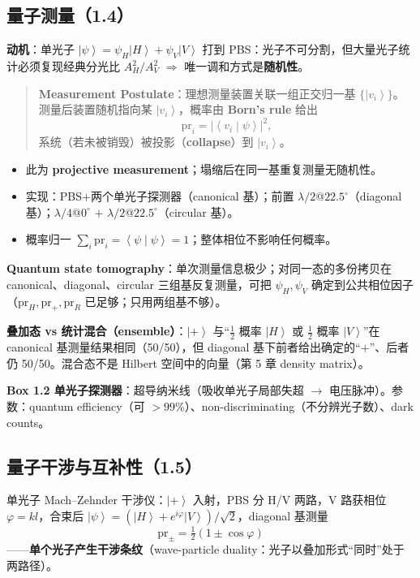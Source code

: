 \documentclass[11pt]{ctexart}
\newcommand{\ket}[1]{\left|#1\right\rangle}
\newcommand{\braket}[2]{\left\langle#1\middle|#2\right\rangle}
\begin{document}
\subsection{量子测量（1.4）}

\textbf{动机}：单光子 $\ket\psi=\psi_H\ket H+\psi_V\ket V$ 打到 PBS：光子不可分割，但大量光子统计必须复现经典分光比 $A_H^2/A_V^2$ $\Rightarrow$ 唯一调和方式是\textbf{随机性}。

\begin{quote}
\textbf{Measurement Postulate}：理想测量装置关联一组正交归一基 $\{\ket{v_i}\}$。测量后装置随机指向某 $\ket{v_i}$，概率由 \textbf{Born's rule} 给出
\[
\mathrm{pr}_i=\big|\braket{v_i}{\psi}\big|^2,
\]
系统（若未被销毁）被投影（\textbf{collapse}）到 $\ket{v_i}$。
\end{quote}

\begin{itemize}
\item 此为 \textbf{projective measurement}；塌缩后在同一基重复测量无随机性。
\item 实现：PBS$+$两个单光子探测器（canonical 基）；前置 $\lambda/2$@$22.5^\circ$（diagonal 基）；$\lambda/4$@$0^\circ$ $+$ $\lambda/2$@$22.5^\circ$（circular 基）。
\item 概率归一 $\sum_i\mathrm{pr}_i=\braket\psi\psi=1$；整体相位不影响任何概率。
\end{itemize}

\textbf{Quantum state tomography}：单次测量信息极少；对同一态的多份拷贝在 canonical、diagonal、circular 三组基反复测量，可把 $\psi_H,\psi_V$ 确定到公共相位因子（$\mathrm{pr}_H,\mathrm{pr}_+,\mathrm{pr}_R$ 已足够；只用两组基不够）。

\textbf{叠加态 vs 统计混合（ensemble）}：$\ket+$ 与``$\tfrac12$ 概率 $\ket H$ 或 $\tfrac12$ 概率 $\ket V$''在 canonical 基测量结果相同（50/50），但 diagonal 基下前者给出确定的``$+$''、后者仍 50/50。混合态不是 Hilbert 空间中的向量（第 5 章 density matrix）。

\textbf{Box 1.2 单光子探测器}：超导纳米线（吸收单光子局部失超 $\to$ 电压脉冲）。参数：quantum efficiency（可 $>99\%$）、non-discriminating（不分辨光子数）、dark counts。

\subsection{量子干涉与互补性（1.5）}

单光子 Mach--Zehnder 干涉仪：$\ket+$ 入射，PBS 分 H/V 两路，V 路获相位 $\varphi=kl$，合束后 $\ket\psi=(\ket H+e^{i\varphi}\ket V)/\sqrt2$，diagonal 基测量
\[
\mathrm{pr}_\pm=\tfrac12(1\pm\cos\varphi)
\]
——\textbf{单个光子产生干涉条纹}（wave-particle duality：光子以叠加形式``同时''处于两路径）。
\end{document}
